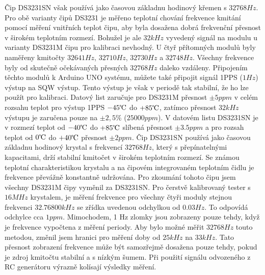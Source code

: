Čip DS3231SN však používá jako časovou základnu hodinový křemen s \(32768Hz\).
Pro obě varianty čipů DS3231 je měřeno teplotní chování frekvence kmitání pomocí měření vnitřních teplot čipu,
aby byla dosažena dobrá frekvenční přesnost v širokém teplotním rozmezí.
Bohužel je ale \(32kHz\) vyvedený signál na modulu u varianty DS3231M čipu pro kalibraci nevhodný.
U čtyř přítomných modulů byly naměřeny kmitočty \(32641Hz\), \(32710Hz\), \(32730Hz\) a \(32748Hz\).
Všechny frekvence byly od skutečně očekávaných přesných \(32768Hz\) daleko vzdáleny.
Připojením těchto modulů k Arduino UNO systému, můžete také připojit signál 1PPS (\(1Hz\)) výstup na SQW výstup.
Tento výstup je však v periodě tak stabilní, že ho lze použít pro kalibraci.
Datový list zaručuje pro DS3231M přesnost \(\pm 5ppm\) v celém rozsahu teplot pro
výstup 1PPS \(-45\celsius\)  do \(+85\celsius\), zatímco přesnost \(32kHz\) výstupu je
zaručena pouze na \(\pm 2,5\%\) (\(25000ppm\)).
V datovém listu DS3231SN je v rozmezí teplot od \(-40\celsius\) do \(+85\celsius\) slíbená
přesnost \(\pm 3.5ppm\) a pro rozsah teplot od \(0\celsius\) do \(+40\celsius\) přesnost \(\pm 2ppm\).
Čip DS3231SN používá jako časovou základnu hodinový krystal s frekvencí \(32768Hz\),
který s přepínatelnými kapacitami, drží stabilní kmitočet v širokém teplotním rozmezí.
Se známou teplotní charakteristikou krystalu a na čipovém integrovaném teplotním čidlu je frekvence převážně konstantně udržována.
Pro zkoumání tohoto čipu jsem všechny DS3231M čipy vyměnil za DS3231SN.
Pro čerstvě kalibrovaný tester s \(16MHz\) krystalem, je měření frekvence pro všechny
čtyři moduly stejnou frekvenci \(32.76800kHz\) se zřídka uvedenou odchylkou od \(0.03Hz\).
To odpovídá odchylce cca \(1ppm\).
Mimochodem, 1 Hz zlomky jsou zobrazeny pouze tehdy, když je frekvence vypočtena z měření periody.
Aby bylo možné měřit \(32768Hz\) touto metodou, změnil jsem hranici pro měření doby od \(25kHz\) na \(33kHz\).
Tato přesnost zobrazení frekvence může být samozřejmě dosažena pouze tehdy, pokud je zdroj kmitočtu stabilní a s nízkým šumem.
Při použití signálu odvozeného z RC generátoru výrazně kolísají výsledky měření.
